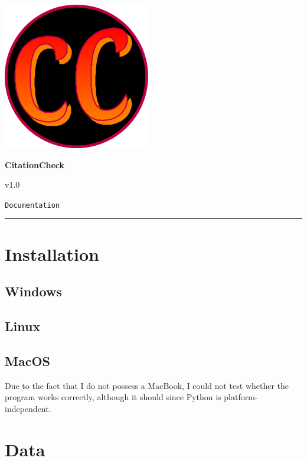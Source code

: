 \documentclass[11pt]{article}
\begin{document}
    \begin{center}
        \includegraphics[scale=0.5]{../logo.png}\vspace{5mm}

        {\Huge \textbf{CitationCheck}}\vspace{2mm}

        {\Large v1.0}\vspace{2mm}

        {\Large \texttt{Documentation}}
    \end{center}
    \hrule \vspace{10mm}

    \section{Installation}

        \subsection{Windows}
    
        \subsection{Linux}

        \subsection{MacOS}

        Due to the fact that I do not possess a MacBook, I could not test whether the program works correctly, although it should since Python is platform-independent.

    \section{Data}
\end{document}
